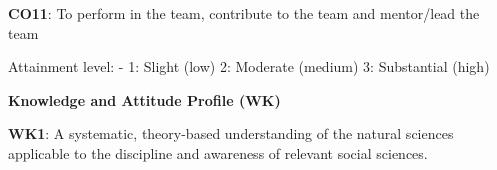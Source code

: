 \begin{titlepage}
{\textbf{CO11}: To perform in the team, contribute to the team and mentor/lead the team
}

\begin{table}[h!]
\caption*{\textbf{CO-PO Mapping}}

\end{table}

{\small Attainment level: - 1: Slight (low) 2: Moderate (medium) 3: Substantial (high)}

\vspace{0.5cm}

\textbf{Knowledge and Attitude Profile (WK)}

\textbf{WK1}: A systematic, theory-based understanding of the natural sciences applicable to the discipline and awareness of relevant social sciences.


\end{titlepage}
